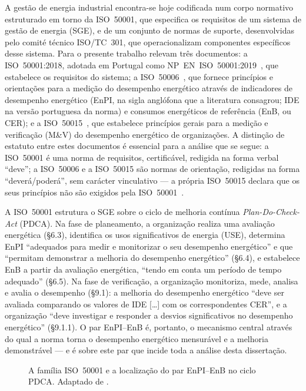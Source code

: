 A gestão de energia industrial encontra-se hoje codificada num corpo normativo estruturado em torno da ISO~50001, que especifica os requisitos de um sistema de gestão de energia (SGE), e de um conjunto de normas de suporte, desenvolvidas pelo comité técnico ISO/TC~301, que operacionalizam componentes específicos desse sistema. Para o presente trabalho relevam três documentos: a ISO~50001:2018, adotada em Portugal como NP~EN~ISO~50001:2019~\cite{ISO50001_2018}, que estabelece os requisitos do sistema; a ISO~50006~\cite{ISO50006_2014}, que fornece princípios e orientações para a medição do desempenho energético através de indicadores de desempenho energético (EnPI, na sigla anglófona que a literatura consagrou; IDE na versão portuguesa da norma) e consumos energéticos de referência (EnB, ou CER); e a ISO~50015~\cite{ISO50015_2014}, que estabelece princípios gerais para a medição e verificação (M\&V) do desempenho energético de organizações. A distinção de estatuto entre estes documentos é essencial para a análise que se segue: a ISO~50001 é uma norma de requisitos, certificável, redigida na forma verbal \enquote{deve}; a ISO~50006 e a ISO~50015 são normas de orientação, redigidas na forma \enquote{deverá/poderá}, sem carácter vinculativo --- a própria ISO~50015 declara que os seus princípios não são exigidos pela ISO~50001~\cite[Introdução]{ISO50015_2014}.

A ISO~50001 estrutura o SGE sobre o ciclo de melhoria contínua \emph{Plan-Do-Check-Act} (PDCA). Na fase de planeamento, a organização realiza uma avaliação energética (\S6.3), identifica os usos significativos de energia (USE), determina EnPI \enquote{adequados para medir e monitorizar o seu desempenho energético} e que \enquote{permitam demonstrar a melhoria do desempenho energético} (\S6.4), e estabelece EnB a partir da avaliação energética, \enquote{tendo em conta um período de tempo adequado} (\S6.5). Na fase de verificação, a organização monitoriza, mede, analisa e avalia o desempenho (\S9.1): a melhoria do desempenho energético \enquote{deve ser avaliada comparando os valores de IDE [\ldots] com os correspondentes CER}, e a organização \enquote{deve investigar e responder a desvios significativos no desempenho energético} (\S9.1.1). O par EnPI--EnB é, portanto, o mecanismo central através do qual a norma torna o desempenho energético mensurável e a melhoria demonstrável --- e é sobre este par que incide toda a análise desta dissertação.

\begin{figure}[htbp]
  \centering
  \caption[A família ISO 50001 e o par EnPI--EnB no ciclo PDCA]{A família ISO~50001 e a localização do par EnPI--EnB no ciclo PDCA. Adaptado de \cite{ISO50001_2018,ISO50006_2014}.}
  \label{fig:familia-iso}
\end{figure}

